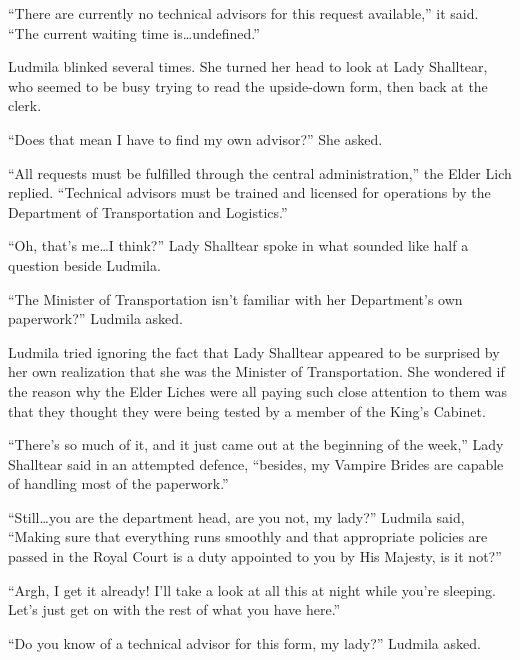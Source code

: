  

“There are currently no technical advisors for this request available,” it said. “The current waiting time is…undefined.”

 

Ludmila blinked several times. She turned her head to look at Lady Shalltear, who seemed to be busy trying to read the upside-down form, then back at the clerk.

 

“Does that mean I have to find my own advisor?” She asked.

 

“All requests must be fulfilled through the central administration,” the Elder Lich replied. “Technical advisors must be trained and licensed for operations by the Department of Transportation and Logistics.”

 

“Oh, that’s me…I think?” Lady Shalltear spoke in what sounded like half a question beside Ludmila.

 

“The Minister of Transportation isn’t familiar with her Department’s own paperwork?” Ludmila asked.

 

Ludmila tried ignoring the fact that Lady Shalltear appeared to be surprised by her own realization that she was the Minister of Transportation. She wondered if the reason why the Elder Liches were all paying such close attention to them was that they thought they were being tested by a member of the King’s Cabinet.

 

“There’s so much of it, and it just came out at the beginning of the week,” Lady Shalltear said in an attempted defence, “besides, my Vampire Brides are capable of handling most of the paperwork.”

 

“Still…you are the department head, are you not, my lady?” Ludmila said, “Making sure that everything runs smoothly and that appropriate policies are passed in the Royal Court is a duty appointed to you by His Majesty, is it not?”

 

“Argh, I get it already! I’ll take a look at all this at night while you’re sleeping. Let’s just get on with the rest of what you have here.”

 

“Do you know of a technical advisor for this form, my lady?” Ludmila asked.

